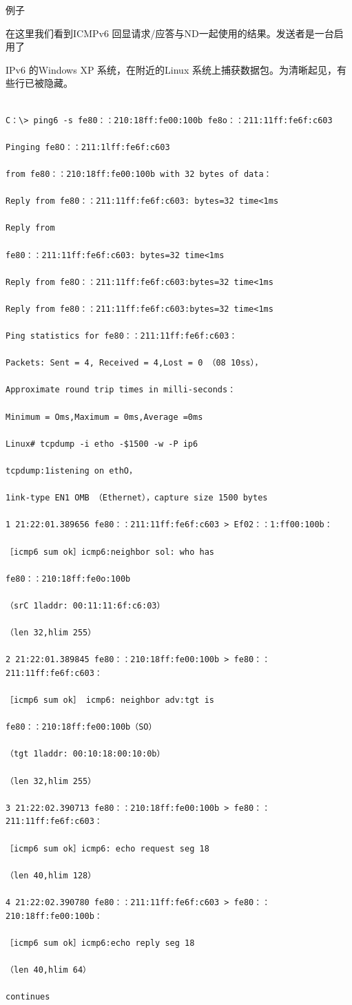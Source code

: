 例子

在这里我们看到ICMPv6 回显请求/应答与ND一起使用的结果。发送者是一台启用了

IPv6 的Windows XP 系统，在附近的Linux 系统上捕获数据包。为清晰起见，有些行已被隐藏。
\begin{verbatim}
    
C：\> ping6 -s fe80：：210:18ff:fe00:100b fe8o：：211:11ff:fe6f:c603

Pinging fe8O：：211:1lff:fe6f:c603

from fe80：：210:18ff:fe00:100b with 32 bytes of data：

Reply from fe80：：211:11ff:fe6f:c603: bytes=32 time<1ms

Reply from

fe80：：211:11ff:fe6f:c603: bytes=32 time<1ms

Reply from fe8O：：211:11ff:fe6f:c603:bytes=32 time<1ms

Reply from fe80：：211:11ff:fe6f:c603:bytes=32 time<1ms

Ping statistics for fe80：：211:11ff:fe6f:c603：

Packets: Sent = 4, Received = 4,Lost = 0 （08 10ss），

Approximate round trip times in milli-seconds：

Minimum = Oms,Maximum = 0ms,Average =0ms

Linux# tcpdump -i etho -$1500 -w -P ip6

tcpdump:1istening on ethO，

1ink-type EN1 OMB （Ethernet），capture size 1500 bytes

1 21:22:01.389656 fe80：：211:11ff:fe6f:c603 > Ef02：：1:ff00:100b：

［icmp6 sum ok］icmp6:neighbor sol: who has

fe80：：210:18ff:fe0o:100b

（srC 1laddr: 00:11:11:6f:c6:03）

（len 32,hlim 255）

2 21:22:01.389845 fe80：：210:18ff:fe00:100b > fe80：：211:11ff:fe6f:c603：

［icmp6 sum ok］ icmp6: neighbor adv:tgt is

fe80：：210:18ff:fe00:100b（SO）

（tgt 1laddr: 00:10:18:00:10:0b）

（len 32,hlim 255）

3 21:22:02.390713 fe80：：210:18ff:fe00:100b > fe80：：211:11ff:fe6f:c603：

［icmp6 sum ok］icmp6: echo request seg 18

（len 40,hlim 128）

4 21:22:02.390780 fe80：：211:11ff:fe6f:c603 > fe80：：210:18ff:fe00:100b：

［icmp6 sum ok］icmp6:echo reply seg 18

（len 40,hlim 64）

continues
\end{verbatim}

